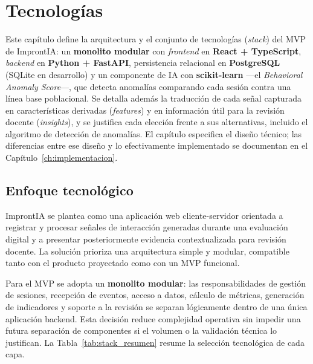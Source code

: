 \chapter{Tecnologías}
\label{ch:tecnologias}

\begin{chapterabstract}
Este capítulo define la arquitectura y el conjunto de tecnologías (\textit{stack}) del MVP de ImprontIA: un \textbf{monolito modular} con \textit{frontend} en \textbf{React + TypeScript}, \textit{backend} en \textbf{Python + FastAPI}, persistencia relacional en \textbf{PostgreSQL} (SQLite en desarrollo) y un componente de IA con \textbf{scikit-learn} ---el \textit{Behavioral Anomaly Score}---, que detecta anomalías comparando cada sesión contra una línea base poblacional. Se detalla además la traducción de cada señal capturada en características derivadas (\textit{features}) y en información útil para la revisión docente (\textit{insights}), y se justifica cada elección frente a sus alternativas, incluido el algoritmo de detección de anomalías. El capítulo especifica el diseño técnico; las diferencias entre ese diseño y lo efectivamente implementado se documentan en el Capítulo~\ref{ch:implementacion}.
\end{chapterabstract}

\section{Enfoque tecnológico}

ImprontIA se plantea como una aplicación web cliente-servidor orientada a registrar y procesar señales de interacción generadas durante una evaluación digital y a presentar posteriormente evidencia contextualizada para revisión docente. La solución prioriza una arquitectura simple y modular, compatible tanto con el producto proyectado como con un MVP funcional.

Para el MVP se adopta un \textbf{monolito modular}: las responsabilidades de gestión de sesiones, recepción de eventos, acceso a datos, cálculo de métricas, generación de indicadores y soporte a la revisión se separan lógicamente dentro de una única aplicación backend. Esta decisión reduce complejidad operativa sin impedir una futura separación de componentes si el volumen o la validación técnica lo justifican. La Tabla~\ref{tab:stack_resumen} resume la selección tecnológica de cada capa.

